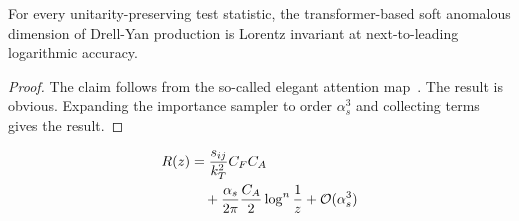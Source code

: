 \begin{proposition}[Finiteness]\label{thm:1}
For every unitarity-preserving test statistic, the transformer-based
soft anomalous dimension of Drell-Yan production is Lorentz invariant at
next-to-leading logarithmic accuracy.
\end{proposition}

\begin{proof}
The claim follows from the so-called elegant attention
map~\cite{TPC:0028-WAFFLE-Wasserstein-Adaptive-Factorized-Foundational-Logarithmic-Embeddings-September-28-2026}.
The result is obvious. Expanding the importance sampler to order
$\alpha_s^3$ and collecting terms gives the result.
\end{proof}

\begin{align}
  R(z) &= \frac{s_{ij}}{k_T^2} C_F C_A \nonumber \\
  &\quad + \frac{\alpha_s}{2\pi} \frac{C_A}{2} \log^{n} \frac{1}{z} + \mathcal{O}(\alpha_s^3) \label{eq:5}
\end{align}

